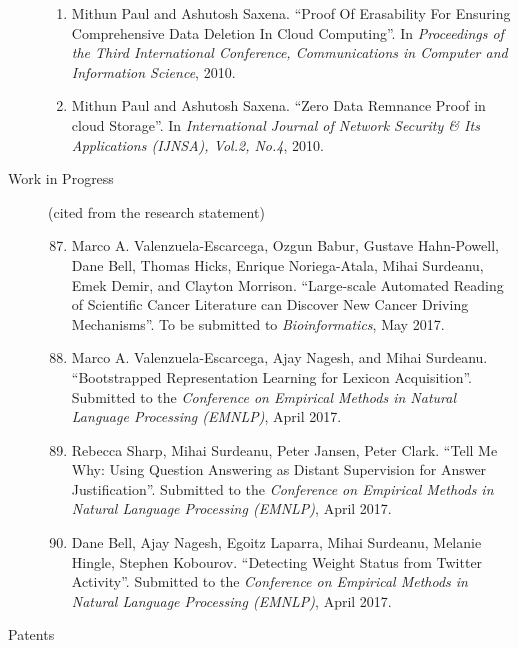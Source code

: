 \documentclass[10pt]{article}
\newcommand{\ve}[1]{{\em #1}} %
\newcommand{\ti}[1]{``#1''} %
\begin{document}
\begin{description}
\begin{enumerate}
\item  Mithun Paul and Ashutosh Saxena.   \ti{Proof Of Erasability For Ensuring Comprehensive Data Deletion In Cloud Computing}. In \ve{  Proceedings of the Third International Conference, Communications in Computer and Information Science}, 2010.

\item  Mithun Paul and Ashutosh Saxena.   \ti{Zero Data Remnance Proof in cloud Storage}. In \ve{  International Journal of Network Security \& Its Applications (IJNSA), Vol.2, No.4}, 2010.




\end{enumerate}


\item [Work in Progress] (cited from the research statement)\
\begin{enumerate}
\setcounter{enumi}{86}

\item 
Marco A. Valenzuela-Escarcega, Ozgun Babur, Gustave Hahn-Powell, Dane Bell, Thomas Hicks, Enrique Noriega-Atala, Mihai Surdeanu, Emek Demir, and Clayton Morrison.  \ti{Large-scale Automated Reading of Scientific Cancer Literature can Discover New  Cancer Driving Mechanisms}. To be submitted to \ve{Bioinformatics}, May 2017.

\item
Marco A. Valenzuela-Escarcega, Ajay Nagesh, and Mihai Surdeanu.  \ti{Bootstrapped Representation Learning for Lexicon Acquisition}.  Submitted to the \ve{Conference on Empirical Methods in Natural Language Processing (EMNLP)}, April 2017.

\item
Rebecca Sharp, Mihai Surdeanu, Peter Jansen, Peter Clark.  \ti{Tell Me Why: Using Question Answering as Distant Supervision for Answer Justification}. Submitted to the \ve{Conference on Empirical Methods in Natural Language Processing (EMNLP)}, April 2017.

\item 
Dane Bell, Ajay Nagesh, Egoitz Laparra, Mihai Surdeanu, Melanie Hingle, Stephen Kobourov. \ti{Detecting Weight Status from Twitter Activity}. Submitted to the \ve{Conference on Empirical Methods in Natural Language Processing (EMNLP)}, April 2017.


\end{enumerate}


\item [Patents] \
\begin{enumerate}


\end{enumerate}
\end{description}
\end{document}
